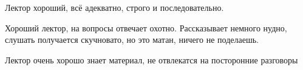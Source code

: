             \begin{commentbox} 
                Лектор хороший, всё адекватно, строго и последовательно. 
            \end{commentbox} 
        
            \begin{commentbox} 
                Хороший лектор, на вопросы отвечает охотно. Рассказывает немного нудно, слушать получается скучновато, но это матан, ничего не поделаешь. 
            \end{commentbox} 
        
            \begin{commentbox} 
                Лектор очень хорошо знает материал, не отвлекатся на посторонние разговоры 
            \end{commentbox} 
    
    

